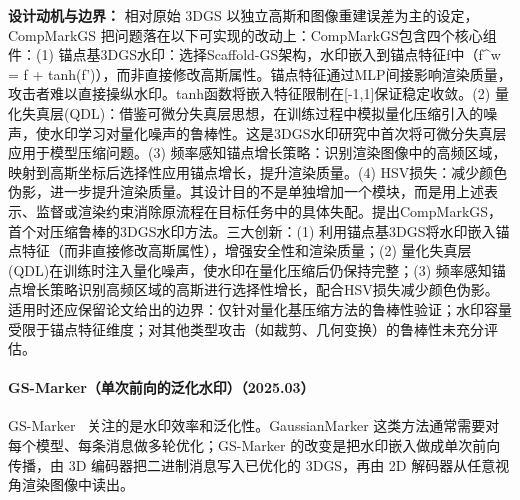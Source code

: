 \textbf{设计动机与边界：} 相对原始 3DGS 以独立高斯和图像重建误差为主的设定，CompMarkGS 把问题落在以下可实现的改动上：CompMarkGS包含四个核心组件：(1) 锚点基3DGS水印：选择Scaffold-GS架构，水印嵌入到锚点特征f中（f\^{}w = f + tanh(f')），而非直接修改高斯属性。锚点特征通过MLP间接影响渲染质量，攻击者难以直接操纵水印。tanh函数将嵌入特征限制在[-1,1]保证稳定收敛。(2) 量化失真层(QDL)：借鉴可微分失真层思想，在训练过程中模拟量化压缩引入的噪声，使水印学习对量化噪声的鲁棒性。这是3DGS水印研究中首次将可微分失真层应用于模型压缩问题。(3) 频率感知锚点增长策略：识别渲染图像中的高频区域，映射到高斯坐标后选择性应用锚点增长，提升渲染质量。(4) HSV损失：减少颜色伪影，进一步提升渲染质量。其设计目的不是单独增加一个模块，而是用上述表示、监督或渲染约束消除原流程在目标任务中的具体失配。提出CompMarkGS，首个对压缩鲁棒的3DGS水印方法。三大创新：(1) 利用锚点基3DGS将水印嵌入锚点特征（而非直接修改高斯属性），增强安全性和渲染质量；(2) 量化失真层(QDL)在训练时注入量化噪声，使水印在量化压缩后仍保持完整；(3) 频率感知锚点增长策略识别高频区域的高斯进行选择性增长，配合HSV损失减少颜色伪影。适用时还应保留论文给出的边界：仅针对量化基压缩方法的鲁棒性验证；水印容量受限于锚点特征维度；对其他类型攻击（如裁剪、几何变换）的鲁棒性未充分评估。
\paragraph{GS-Marker（单次前向的泛化水印）（2025.03）}
GS-Marker~\cite{2503_18718} 关注的是水印效率和泛化性。GaussianMarker 这类方法通常需要对每个模型、每条消息做多轮优化；GS-Marker 的改变是把水印嵌入做成单次前向传播，由 3D 编码器把二进制消息写入已优化的 3DGS，再由 2D 解码器从任意视角渲染图像中读出。

